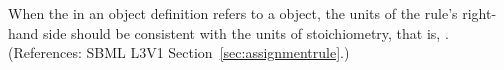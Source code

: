 When the  in an \AssignmentRule object definition refers to
a \SpeciesReference object, the units of the rule's right-hand side should
be consistent with the units of stoichiometry, that is,
.  (References: SBML L3V1
Section~\ref{sec:assignmentrule}.)

